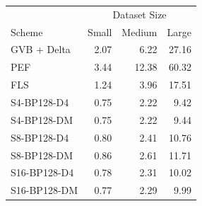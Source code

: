 \begin{tabular}{lrrr}
\toprule
 & \multicolumn{3}{c}{Dataset Size} \\
Scheme & Small & Medium & Large \\
\midrule
GVB + Delta & 2.07 & 6.22 & 27.16 \\
PEF & 3.44 & 12.38 & 60.32 \\
FLS & 1.24 & 3.96 & 17.51 \\
S4-BP128-D4 & 0.75 & 2.22 & 9.42 \\
S4-BP128-DM & 0.75 & 2.22 & 9.44 \\
S8-BP128-D4 & 0.80 & 2.41 & 10.76 \\
S8-BP128-DM & 0.86 & 2.61 & 11.71 \\
S16-BP128-D4 & 0.78 & 2.31 & 10.02 \\
S16-BP128-DM & 0.77 & 2.29 & 9.99 \\
\bottomrule
\end{tabular}
